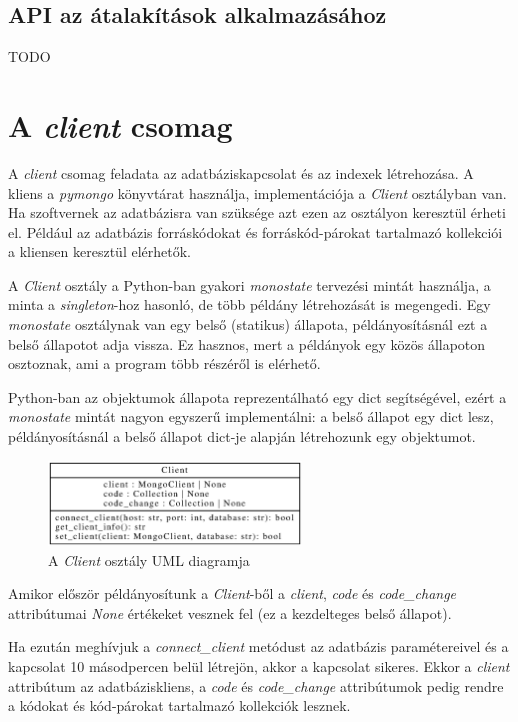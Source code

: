 \subsection{API az átalakítások alkalmazásához}

TODO

\pagebreak

\section{A \emph{client} csomag}

A \emph{client} csomag feladata az adatbáziskapcsolat és az indexek létrehozása.
A kliens a \emph{pymongo} könyvtárat használja, implementációja a \emph{Client} osztályban van.
Ha szoftvernek az adatbázisra van szüksége azt ezen az osztályon keresztül érheti el.
Például az adatbázis forráskódokat és forráskód-párokat tartalmazó kollekciói a kliensen
keresztül elérhetők.

A \emph{Client} osztály a Python-ban gyakori \emph{monostate} \cite{monostatePattern}
tervezési mintát használja, a minta a \emph{singleton}-hoz hasonló,
de több példány létrehozását is megengedi.
Egy \emph{monostate} osztálynak van egy belső (statikus) állapota,
példányosításnál ezt a belső állapotot adja vissza.
Ez hasznos, mert a példányok egy közös állapoton osztoznak, ami a program több részéről is elérhető.

Python-ban az objektumok állapota reprezentálható egy dict segítségével,
ezért a \emph{monostate} mintát nagyon egyszerű implementálni:
a belső állapot egy dict lesz, példányosításnál a belső állapot dict-je alapján létrehozunk egy objektumot.

\begin{figure}[H]
	\centering
	\includegraphics[width=0.6\textwidth]{images/uml/Client.eps}
	\caption{A \emph{Client} osztály UML diagramja}
\end{figure}

Amikor először példányosítunk a \emph{Client}-ből a \emph{client}, \emph{code} és \emph{code\_change}
attribútumai \emph{None} értékeket vesznek fel (ez a kezdelteges belső állapot).

Ha ezután meghívjuk a \emph{connect\_client} metódust az adatbázis paramétereivel
és a kapcsolat 10 másodpercen belül létrejön, akkor a kapcsolat sikeres.
Ekkor
a \emph{client} attribútum az adatbáziskliens,
a \emph{code} és \emph{code\_change} attribútumok pedig rendre
a kódokat és kód-párokat tartalmazó kollekciók lesznek.

